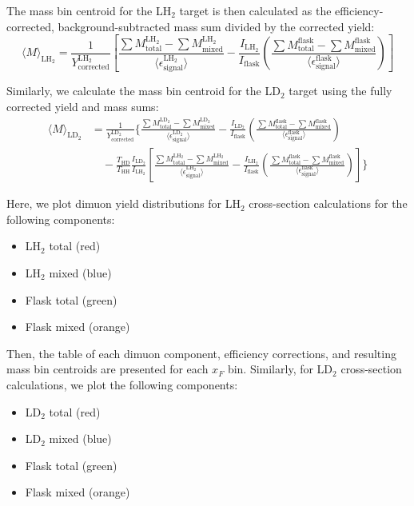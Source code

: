 The mass bin centroid for the LH$_2$ target is then calculated as the efficiency-corrected, background-subtracted mass sum divided by the corrected yield:
\begin{equation}
    \langle M \rangle_{\text{LH}_2} = \frac{1}{Y^{\text{LH}_2}_{\text{corrected}}} \left[ \frac{\sum M^{\text{LH}_2}_{\text{total}} - \sum M^{\text{LH}_2}_{\text{mixed}}}{\langle\epsilon^{\text{LH}_2}_{\text{signal}}\rangle} - \frac{I_{\text{LH}_2}}{I_{\text{flask}}}\left( \frac{\sum M^{\text{flask}}_{\text{total}} - \sum M^{\text{flask}}_{\text{mixed}}}{\langle\epsilon^{\text{flask}}_{\text{signal}}\rangle} \right) \right]
\end{equation}

Similarly, we calculate the mass bin centroid for the LD$_2$ target using the fully corrected yield and mass sums:
\begin{align}
    \langle M \rangle_{\text{LD}_2} &= \frac{1}{Y^{\text{LD}_2}_{\text{corrected}}} \Bigg\{ \frac{\sum M^{\text{LD}_2}_{\text{total}} - \sum M^{\text{LD}_2}_{\text{mixed}}}{\langle\epsilon^{\text{LD}_2}_{\text{signal}}\rangle} - \frac{I_{\text{LD}_2}}{I_{\text{flask}}}\left( \frac{\sum M^{\text{flask}}_{\text{total}} - \sum M^{\text{flask}}_{\text{mixed}}}{\langle\epsilon^{\text{flask}}_{\text{signal}}\rangle} \right) \nonumber \\
    &\quad - \frac{T_{\text{HD}}}{T_{\text{HH}}} \frac{I_{\text{LD}_2}}{I_{\text{LH}_2}}\left[\frac{\sum M^{\text{LH}_2}_{\text{total}} - \sum M^{\text{LH}_2}_{\text{mixed}}}{\langle\epsilon^{\text{LH}_2}_{\text{signal}}\rangle} - \frac{I_{\text{LH}_2}}{I_{\text{flask}}}\left( \frac{\sum M^{\text{flask}}_{\text{total}} - \sum M^{\text{flask}}_{\text{mixed}}}{\langle\epsilon^{\text{flask}}_{\text{signal}}\rangle} \right)\right] \Bigg\}
\end{align}

Here, we plot dimuon yield distributions for LH$_2$ cross-section calculations for the following components:
\begin{itemize}
    \item LH$_2$ total (red)
    \item LH$_2$ mixed (blue)
    \item Flask total (green)
    \item Flask mixed (orange)
\end{itemize}

Then, the table of each dimuon component, efficiency corrections, and resulting mass bin centroids are presented for each $x_F$ bin. Similarly, for LD$_2$ cross-section calculations, we plot the following components:
\begin{itemize}
    \item LD$_2$ total (red)
    \item LD$_2$ mixed (blue)
    \item Flask total (green)
    \item Flask mixed (orange)
\end{itemize}

